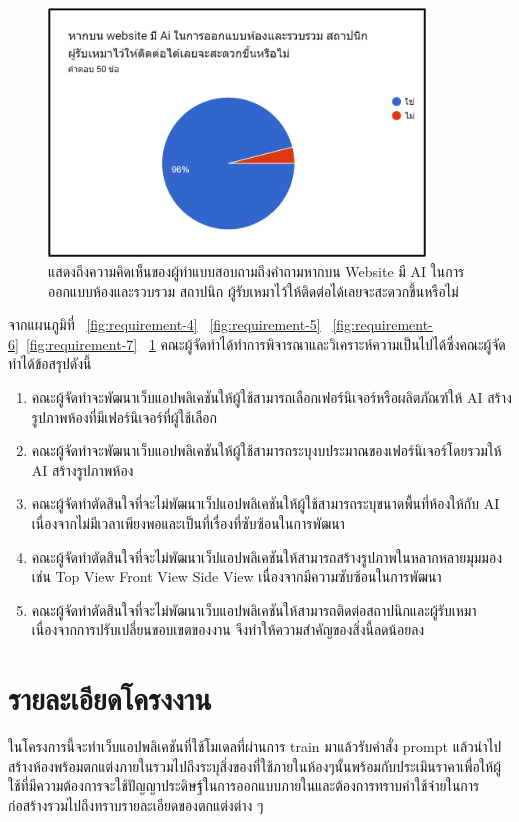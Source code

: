 \documentclass[12pt,oneside,openright,a4paper]{cpe-thai-project}
\begin{document}
\vspace{\fill}\clearpage

\begin{figure}[!h]\centering
\includegraphics[width=10cm]{image/requirement-8.jpg}
\caption{แสดงถึงความคิดเห็นของผู้ทำแบบสอบถามถึงคำถามหากบน Website มี AI ในการออกแบบห้องและรวบรวม สถาปนิก ผู้รับเหมาไว้ให้ติดต่อได้เลยจะสะดวกขึ้นหรือไม่}
\label{fig:requirement-8}
\end{figure}



จากแผนภูมิที่ ~\ref{fig:requirement-4} ~\ref{fig:requirement-5} ~\ref{fig:requirement-6}~\ref{fig:requirement-7} ~\ref{fig:requirement-8} คณะผู้จัดทำได้ทำการพิจารณาและวิเคราะห์ความเป็นไปได้ซึ่งคณะผู้จัดทำได้ข้อสรุปดังนี้ 

\begin{enumerate}
\item คณะผู้จัดทำจะพัฒนาเว็บแอปพลิเคชันให้ผู้ใช้สามารถเลือกเฟอร์นิเจอร์หรือผลิตภัณฑ์ให้ AI สร้างรูปภาพห้องที่มีเฟอร์นิเจอร์ที่ผู้ใช้เลือก
\item คณะผู้จัดทำจะพัฒนาเว็บแอปพลิเคชันให้ผู้ใช้สามารถระบุงบประมาณของเฟอร์นิเจอร์โดยรวมให้ AI สร้างรูปภาพห้อง
\item คณะผู้จัดทำตัดสินใจที่จะไม่พัฒนาเว็ปแอปพลิเคชันให้ผู้ใช้สามารถระบุขนาดพื้นที่ห้องให้กับ AI เนื่องจากไม่มีเวลาเพียงพอและเป็นที่เรื่องที่ซับซ้อนในการพัฒนา 
\item คณะผู้จัดทำตัดสินใจที่จะไม่พัฒนาเว็ปแอปพลิเคชันให้สามารถสร้างรูปภาพในหลากหลายมุมมอง เช่น Top View Front View Side View เนื่องจากมีความซับซ้อนในการพัฒนา 
\item คณะผู้จัดทำตัดสินใจที่จะไม่พัฒนาเว็บแอปพลิเคชันให้สามารถติดต่อสถาปนิกและผู้รับเหมา เนื่องจากการปรับเปลี่ยนขอบเขตของงาน จึงทำให้ความสำคัญของสิ่งนี้ลดน้อยลง
\end{enumerate}

\section{รายละเอียดโครงงาน}
\hspace {18pt} ในโครงการนี้จะทำเว็บแอปพลิเคชันที่ใช้โมเดลที่ผ่านการ train มาแล้วรับคำสั่ง prompt แล้วนำไปสร้างห้องพร้อมตกแต่งภายในรวมไปถึงระบุสิ่งของที่ใช้ภายในห้องๆนั้นพร้อมกับประเมินราคาเพื่อให้ผู้ใช้ที่มีความต้องการจะใช้ปัญญาประดิษฐ์ในการออกแบบภายในและต้องการทราบค่าใช้จ่ายในการก่อสร้างรวมไปถึงทราบรายละเอียดของตกแต่งต่าง ๆ
\end{document}

